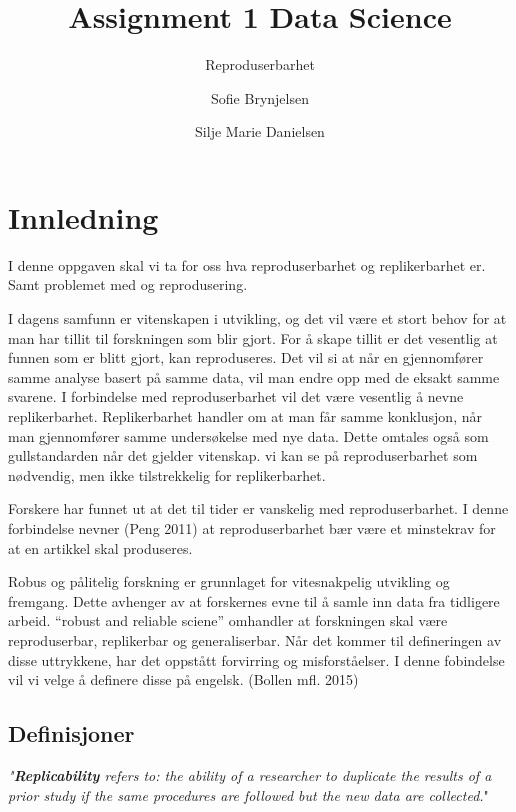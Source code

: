 \documentclass[
  12pt,
  norsk,
]{article}
\title{Assignment 1 Data Science}
\subtitle{Reproduserbarhet}
\author{Sofie Brynjelsen \and Silje Marie Danielsen}
\date{}
\begin{document}
\maketitle

{
\setcounter{tocdepth}{2}
\tableofcontents
}
\newpage

\hypertarget{innledning}{%
\section{Innledning}\label{innledning}}

I denne oppgaven skal vi ta for oss hva reproduserbarhet og
replikerbarhet er. Samt problemet med og reprodusering.

I dagens samfunn er vitenskapen i utvikling, og det vil være et stort
behov for at man har tillit til forskningen som blir gjort. For å skape
tillit er det vesentlig at funnen som er blitt gjort, kan reproduseres.
Det vil si at når en gjennomfører samme analyse basert på samme data,
vil man endre opp med de eksakt samme svarene. I forbindelse med
reproduserbarhet vil det være vesentlig å nevne replikerbarhet.
Replikerbarhet handler om at man får samme konklusjon, når man
gjennomfører samme undersøkelse med nye data. Dette omtales også som
gullstandarden når det gjelder vitenskap. vi kan se på reproduserbarhet
som nødvendig, men ikke tilstrekkelig for replikerbarhet.

Forskere har funnet ut at det til tider er vanskelig med
reproduserbarhet. I denne forbindelse nevner (Peng 2011) at
reproduserbarhet bær være et minstekrav for at en artikkel skal
produseres.

Robus og pålitelig forskning er grunnlaget for vitesnakpelig utvikling
og fremgang. Dette avhenger av at forskernes evne til å samle inn data
fra tidligere arbeid. ``robust and reliable sciene'' omhandler at
forskningen skal være reproduserbar, replikerbar og generaliserbar. Når
det kommer til defineringen av disse uttrykkene, har det oppstått
forvirring og misforståelser. I denne fobindelse vil vi velge å definere
disse på engelsk. (Bollen mfl. 2015)

\hypertarget{definisjoner}{%
\subsection{Definisjoner}\label{definisjoner}}

\emph{"\textbf{Replicability} refers to: the ability of a researcher to
duplicate the results of a prior study if the same procedures are
followed but the new data are collected.}"
\end{document}
